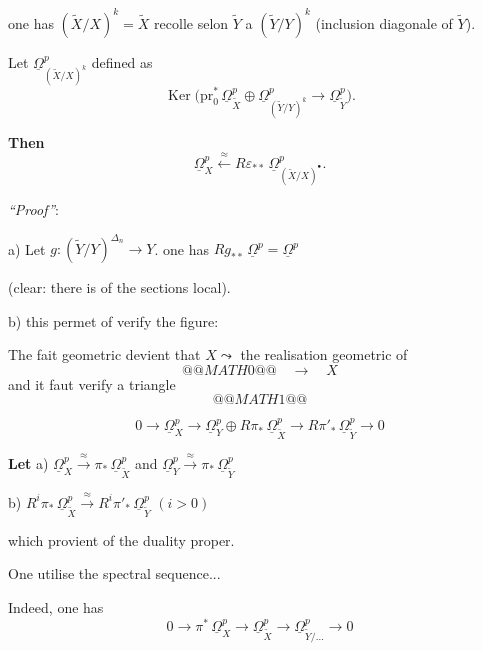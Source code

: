 \documentclass[11pt,a4paper]{article}
\theoremstyle{plain}
\theoremstyle{definition}
\DeclareMathOperator{\Ker}{Ker}
\begin{document}
one has $(\widetilde{X}/X)^{k} = \widetilde{X}$ recolle selon $\widetilde{Y}$ a $(\widetilde{Y}/Y)^{k}$ (inclusion diagonale of $\widetilde{Y}$).

Let $\underline{\Omega}^{p}_{(\widetilde{X}/X)^{k}}$ defined as
\[
\Ker\bigl(\mathrm{pr}_{0}^{*}\, \underline{\Omega}^{p}_{\widetilde{X}} \oplus \underline{\Omega}^{p}_{(\widetilde{Y}/Y)^{k}} \longrightarrow \underline{\Omega}^{p}_{\widetilde{Y}}\bigr).
\]

\noindent\textbf{Then}
\[
\underline{\Omega}^{p}_{X} \xleftarrow{\;\approx\;} R\varepsilon_{**}\, \underline{\Omega}^{p}_{(\widetilde{X}/X)^{\bullet}}.
\]

\noindent\textit{``Proof''}:

a) Let $g : (\widetilde{Y}/Y)^{\Delta_{n}} \to Y$. one has $Rg_{**}\, \underline{\Omega}^{p} = \underline{\Omega}^{p}$

(clear: there is of the sections local).

b) this permet of verify the figure:

\newpage

The fait geometric devient that $X \leadsto$ the realisation geometric of
\[
@@MATH0@@
\quad \longrightarrow \quad X
\]
and it faut verify a triangle
\[
@@MATH1@@
\]

\vspace{0.3cm}

\[
0 \longrightarrow \underline{\Omega}^{p}_{X} \longrightarrow \underline{\Omega}^{p}_{Y} \oplus R\pi_{*}\,\underline{\Omega}^{p}_{\widetilde{X}} \longrightarrow R\pi'_{*}\,\underline{\Omega}^{p}_{\widetilde{Y}} \longrightarrow 0
\]

\noindent\textbf{Let}
a) $\underline{\Omega}^{p}_{X} \xrightarrow{\;\approx\;} \pi_{*}\,\underline{\Omega}^{p}_{\widetilde{X}}$ and $\underline{\Omega}^{p}_{Y} \xrightarrow{\;\approx\;} \pi_{*}\,\underline{\Omega}^{p}_{\widetilde{Y}}$

b) $R^{i}\pi_{*}\,\underline{\Omega}^{p}_{\widetilde{X}} \xrightarrow{\;\approx\;} R^{i}\pi'_{*}\,\underline{\Omega}^{p}_{\widetilde{Y}}$ $(i > 0)$

which provient of the duality proper.

\vspace{0.3cm}

One utilise the spectral sequence...

Indeed, one has
\[
0 \longrightarrow \pi^{*}\,\underline{\Omega}^{p}_{X} \longrightarrow \underline{\Omega}^{p}_{\widetilde{X}} \longrightarrow \underline{\Omega}^{p}_{\widetilde{Y}/\ldots} \longrightarrow 0
\]
\end{document}
